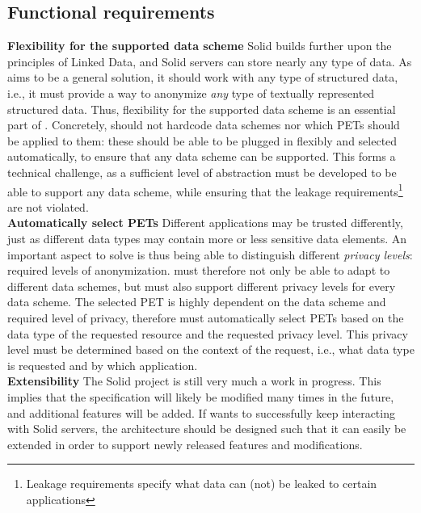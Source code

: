 \subsection{Functional requirements}
\noindent \textbf{Flexibility for the supported data scheme} Solid builds further upon the principles of Linked Data, and Solid servers can store nearly any type of data. As \middleware{} aims to be a general solution, it should work with any type of structured data, i.e., it must provide a way to anonymize \textit{any} type of textually represented structured data. Thus, flexibility for the supported data scheme is an essential part of \middleware{}. Concretely, \middleware{} should not hardcode data schemes nor which \gls{PETs} should be applied to them: these should be able to be plugged in flexibly and selected automatically, to ensure that any data scheme can be supported. This forms a technical challenge, as a sufficient level of abstraction must be developed to be able to support any data scheme, while ensuring that the leakage requirements\footnote{Leakage requirements specify what data can (not) be leaked to certain applications} are not violated. \\

\noindent \textbf{Automatically select \gls{PETs}} Different applications may be trusted differently, just as different data types may contain more or less sensitive data elements. An important aspect to solve is thus being able to distinguish different \textit{privacy levels}: required levels of anonymization. \middleware{} must therefore not only be able to adapt to different data schemes, but must also support different privacy levels for every data scheme. The selected PET is highly dependent on the data scheme and required level of privacy, therefore \middleware{} must automatically select \gls{PETs} based on the data type of the requested resource and the requested privacy level. This privacy level must be determined based on the context of the request, i.e., what data type is requested and by which application. \\

\noindent \textbf{Extensibility} The Solid project is still very much a work in progress. This implies that the specification will likely be modified many times in the future, and additional features will be added. If \middleware{} wants to successfully keep interacting with Solid servers, the architecture should be designed such that it can easily be extended in order to support newly released features and modifications. \\

